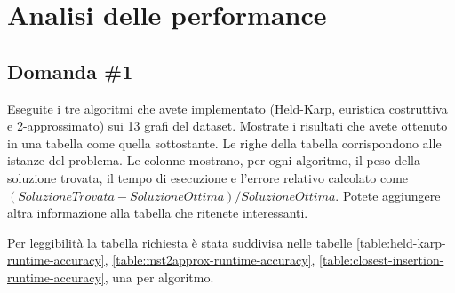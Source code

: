 \section{Analisi delle performance}
\label{cap:performance-analysis}

\subsection{Domanda \#1}
\label{sec:question-1}

\begin{displayquote}
Eseguite i tre algoritmi che avete implementato (Held-Karp,
euristica costruttiva e 2-approssimato) sui 13 grafi del dataset.
Mostrate i risultati che avete ottenuto in una tabella come quella
sottostante. Le righe della tabella corrispondono alle istanze del
problema. Le colonne mostrano, per ogni algoritmo, il peso della
soluzione trovata, il tempo di esecuzione e l'errore relativo
calcolato come $(SoluzioneTrovata-SoluzioneOttima)/SoluzioneOttima$.
Potete aggiungere altra informazione alla tabella che ritenete
interessanti.
\end{displayquote}

Per leggibilità la tabella richiesta è stata suddivisa nelle tabelle
\ref{table:held-karp-runtime-accuracy},
\ref{table:mst2approx-runtime-accuracy},
\ref{table:closest-insertion-runtime-accuracy},
una per algoritmo.

